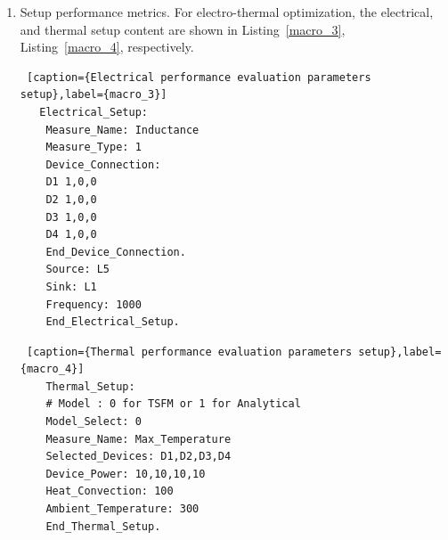 \documentclass[11pt]{article}
\begin{document}
\begin{enumerate}
    \item Setup performance metrics. For electro-thermal optimization, the electrical, and thermal setup content are shown in Listing~\ref{macro_3}, Listing~\ref{macro_4}, respectively.

    \begin{lstlisting} [caption={Electrical performance evaluation parameters setup},label={macro_3}]
   Electrical_Setup:
    Measure_Name: Inductance
    Measure_Type: 1
    Device_Connection:
    D1 1,0,0
    D2 1,0,0
    D3 1,0,0
    D4 1,0,0
    End_Device_Connection.
    Source: L5
    Sink: L1
    Frequency: 1000
    End_Electrical_Setup.
    \end{lstlisting}
    \pagebreak
    \begin{lstlisting} [caption={Thermal performance evaluation parameters setup},label={macro_4}]
    Thermal_Setup:
    # Model : 0 for TSFM or 1 for Analytical
    Model_Select: 0
    Measure_Name: Max_Temperature
    Selected_Devices: D1,D2,D3,D4
    Device_Power: 10,10,10,10
    Heat_Convection: 100
    Ambient_Temperature: 300
    End_Thermal_Setup.

    
    \end{lstlisting}
    

    

\end{enumerate}
\end{document}
